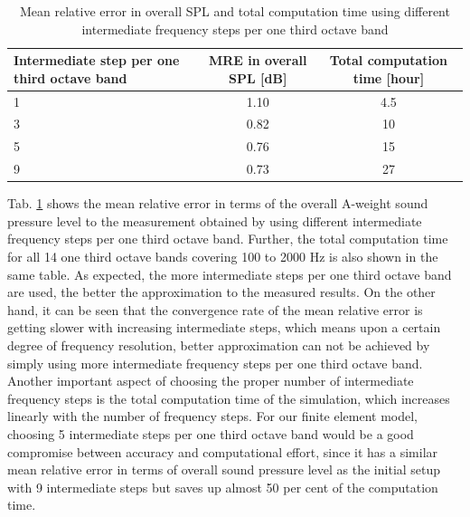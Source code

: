 \begin{table}[H]
	\caption{Mean relative error in overall SPL and total computation time using different intermediate frequency steps per one third octave band}
	\label{tab:freq_steps_MRE}
	\begin{tabularx}{\columnwidth}{|X|c|c|}
	\hline
	\textbf{Intermediate step per one third octave band} & \textbf{MRE in overall SPL {[}dB{]}} & \textbf{Total computation time {[}hour{]}} \\ \hline
	\hspace{65pt} 1                                                    & 1.10                                 & 4.5                                        \\ \hline
	\hspace{65pt} 3                                                    & 0.82                                 & 10                                         \\ \hline
	\hspace{65pt} 5                                                    & 0.76                                 & 15                                         \\ \hline
	\hspace{65pt} 9                                                    & 0.73                                 & 27                                         \\ \hline
	\end{tabularx}
\end{table}

Tab. \ref{tab:freq_steps_MRE} shows the mean relative error in terms of the overall A-weight sound pressure level to the measurement obtained by using different intermediate frequency steps per one third octave band. Further, the total computation time for all 14 one third octave bands covering 100 to 2000 Hz is also shown in the same table. As expected, the more intermediate steps per one third octave band are used, the better the approximation to the measured results. On the other hand, it can be seen that the convergence rate of the mean relative error is getting slower with increasing intermediate steps, which means upon a certain degree of frequency resolution, better approximation can not be achieved by simply using more intermediate frequency steps per one third octave band. Another important aspect of choosing the proper number of intermediate frequency steps is the total computation time of the simulation, which increases linearly with the number of frequency steps. For our finite element model, choosing 5 intermediate steps per one third octave band would be a good compromise between accuracy and computational effort, since it has a similar mean relative error in terms of overall sound pressure level as the initial setup with 9 intermediate steps but saves up almost 50 per cent of the computation time.

